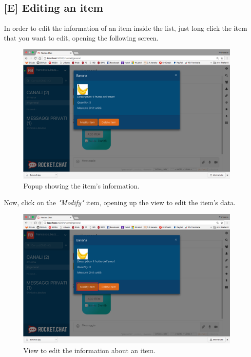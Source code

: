 \subsection{[E] Editing an item}
In order to edit the information of an item inside the list, just long click the item that you want to edit, opening the following screen.

\begin{figure}[H]
  \centering 
  \includegraphics[width=\textwidth]{Sections/3-HowToUse/Images/item_details.png}
  \caption{Popup showing the item's information.}
\end{figure}

Now, click on the \textit{"Modify"} item, opening up the view to edit the item's data.

\begin{figure}[H]
  \centering 
  \includegraphics[width=\textwidth]{Sections/3-HowToUse/Images/popup_item_modify.png}
  \caption{View to edit the information about an item.}
\end{figure}

